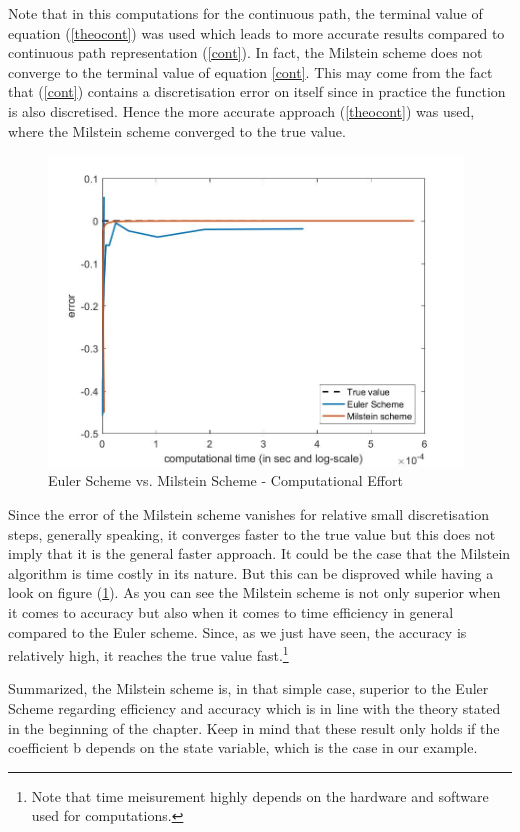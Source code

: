 \documentclass[a4paper,11pt]{article}
\begin{document}
Note that in this computations for the continuous path, the terminal value of equation (\ref{theocont}) was used which leads to more accurate results compared to continuous path representation (\ref{cont}). In fact, the Milstein scheme does not converge to the terminal value of equation \ref{cont}. This may come from the fact that (\ref{cont}) contains a discretisation error on itself since in practice the function is also discretised.  Hence the more accurate approach (\ref{theocont}) was used, where the Milstein scheme converged to the true value.

\begin{figure}[h!]
\centering
\includegraphics[width=11cm]{plot14.jpeg}
\caption{Euler Scheme vs. Milstein Scheme - Computational Effort}
\label{plot13}
\end{figure}

Since the error of the Milstein scheme vanishes for relative small discretisation steps, generally speaking, it converges faster to the true value but this does not imply that it is the general faster approach. It could be the case that the Milstein algorithm is time costly in its nature. But this can be disproved while having a look on figure (\ref{plot13}). As you can see the Milstein scheme is not only superior when it comes to accuracy but also when it comes to time efficiency in general compared to the Euler scheme. Since, as we just have seen, the accuracy is relatively high, it reaches the true value fast.\footnote{Note that time meisurement highly depends on the hardware and software used for computations.}

Summarized, the Milstein scheme is, in that simple case, superior to the Euler Scheme regarding efficiency and accuracy which is in line with the theory stated in the beginning of the chapter. Keep in mind that these result only holds if the coefficient b depends on the state variable, which is the case in our example.
\end{document}
